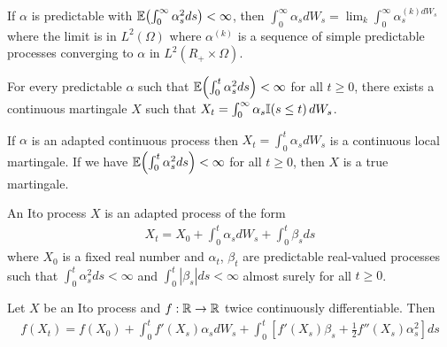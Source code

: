 \begin{defn}
  \label{sec:brown-moti-stoch-4}
  If $\alpha$ is predictable with $\E{\int_{0}^{\infty} \alpha_{s}^{2}
    ds} < \infty$, then $\int_{0}^{\infty} \alpha_{s} dW_{s} = \lim_{k}
  \int_{0}^{\infty} \alpha_{s}^{(k) dW_{s}}$ where the limit is in
  $L^{2}(\Omega)$ where $\alpha^{(k)}$ is a sequence of simple
  predictable processes converging to $\alpha$ in $L^{2}(R_{+} \times \Omega)$.
\end{defn}

\begin{thm}
  \label{sec:brown-moti-stoch-5}
  For every predictable $\alpha$ such that $\E{\int_{0}^{t}
    \alpha_{s}^{2} ds} < \infty$ for all $t \geq 0$, there exists a
  continuous martingale $X$ such that $X_{t} = \int_{0}^{\infty}
  \alpha_{s} \I{s \leq t} dW_{s}$.
\end{thm}

\begin{thm}
  \label{sec:brown-moti-stoch-6}
  If $\alpha$ is an adapted continuous process then $X_{t} =
  \int_{0}^{t} \alpha_{s} dW_{s}$ is a continuous local martingale. If
  we have $\E{\int_{0}^{t} \alpha_{s}^{2} ds} < \infty$ for all $t
  \geq 0$, then $X$ is a true martingale.
\end{thm}

\newcommand{\ito}{Ito\xspace}

\begin{defn}
  \label{sec:brown-moti-stoch-7}
  An \ito process $X$ is an adapted process of the form
  \begin{align}
    \label{eq:16}
    X_{t} = X_{0} + \int_{0}^{t} \alpha_{s} dW_{s} + \int_{0}^{t}
    \beta_{s} ds
  \end{align} where $X_{0}$ is a fixed real number and $\alpha_{t}$,
  $\beta_{t}$ are predictable real-valued processes such that
  $\int_{0}^{t} \alpha_{s}^{2} ds < \infty$ and $\int_{0}^{t}
  |\beta_{s}| ds < \infty$ almost surely for all $t \geq 0$.
\end{defn}

\begin{thm}
  \label{sec:brown-moti-stoch-8}
  Let $X$ be an \ito process and $f: \mathbb{R} \rightarrow \mathbb{R}$ twice
  continuously differentiable.  Then
  \begin{align}
    \label{eq:17}
    f(X_{t}) = f(X_{0}) + \int_{0}^{t} f'(X_{s}) \alpha_{s} dW_{s} +
    \int_{0}^{t} [f'(X_{s}) \beta_{s} + \frac{1}{2} f''(X_{s})
    \alpha_{s}^{2}] ds
  \end{align}
\end{thm}

